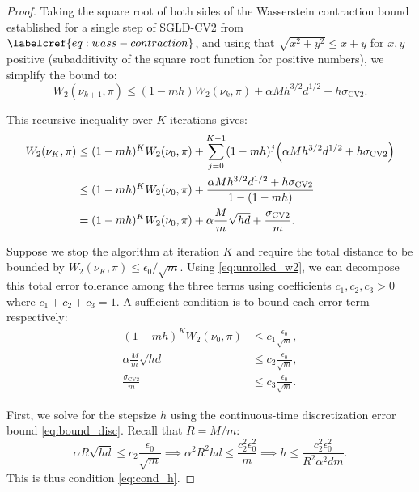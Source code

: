\begin{proof}
    Taking the square root of both sides of the Wasserstein contraction bound established for a single step of SGLD-CV2 from $\labelcref{eq:wass-contraction}$, and using that $\sqrt{x^2 + y^2} \leq x + y$ for $x,y$ positive (subadditivity of the square root function for positive numbers), we simplify the bound to:
\begin{equation}
    W_2(\nu_{k+1}, \pi) \leq (1-mh)W_2(\nu_k,\pi) + \alpha M h^{3/2} d^{1/2} + h\sigma_{\text{CV2}}.
\end{equation}

This recursive inequality over $K$ iterations gives:
\begin{align}
    W_2(\nu_K, \pi) &\leq (1-mh)^K W_2(\nu_0, \pi) + \sum_{j=0}^{K-1} (1-mh)^j \Big( \alpha M h^{3/2} d^{1/2} + h\sigma_{\text{CV2}} \Big) \notag \\
    &\leq (1-mh)^K W_2(\nu_0, \pi) + \frac{\alpha M h^{3/2} d^{1/2} + h\sigma_{\text{CV2}}}{1 - (1-mh)} \notag \\
    &= (1-mh)^K W_2(\nu_0, \pi) + \alpha \frac{M}{m} \sqrt{hd} + \frac{\sigma_{\text{CV2}}}{m}. \label{eq:unrolled_w2}
\end{align}

Suppose we stop the algorithm at iteration $K$ and require the total distance to be bounded by $W_2(\nu_K, \pi) \leq \epsilon_0 / \sqrt{m}$. Using \eqref{eq:unrolled_w2}, we can decompose this total error tolerance among the three terms using coefficients $c_1, c_2, c_3 > 0$ where $c_1 + c_2 + c_3 = 1$. A sufficient condition is to bound each error term respectively:
\begin{align}
    (1-mh)^K W_2(\nu_0, \pi) &\leq c_1 \frac{\epsilon_0}{\sqrt{m}}, \label{eq:bound_init} \\
    \alpha \frac{M}{m} \sqrt{hd} &\leq c_2 \frac{\epsilon_0}{\sqrt{m}}, \label{eq:bound_disc} \\
    \frac{\sigma_{\text{CV2}}}{m} &\leq c_3 \frac{\epsilon_0}{\sqrt{m}}. \label{eq:bound_noise}
\end{align}

First, we solve for the stepsize $h$ using the continuous-time discretization error bound \eqref{eq:bound_disc}. Recall that $R = M/m$:
\begin{equation}
    \alpha R \sqrt{hd} \leq c_2 \frac{\epsilon_0}{\sqrt{m}} \implies \alpha^2 R^2 hd \leq \frac{c_2^2 \epsilon_0^2}{m} \implies h \leq \frac{c_2^2 \epsilon_0^2}{R^2 \alpha^2 d m}.
\end{equation}
This is thus condition \eqref{eq:cond_h}.


\end{proof}
